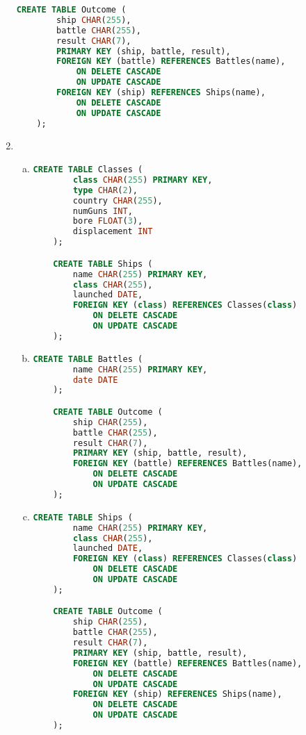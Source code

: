 \documentclass[12pt]{article}
\begin{document}
\begin{enumerate}[1.]
\begin{lstlisting}[language=SQL]
    CREATE TABLE Outcome (
        ship CHAR(255),
        battle CHAR(255),
        result CHAR(7),
        PRIMARY KEY (ship, battle, result),
        FOREIGN KEY (battle) REFERENCES Battles(name),
            ON DELETE CASCADE
            ON UPDATE CASCADE
        FOREIGN KEY (ship) REFERENCES Ships(name),
            ON DELETE CASCADE
            ON UPDATE CASCADE
    );

    \end{lstlisting}

    \item

    \begin{enumerate}[a)]
        \item

    \begin{lstlisting}[language=SQL]
    CREATE TABLE Classes (
        class CHAR(255) PRIMARY KEY,
        type CHAR(2),
        country CHAR(255),
        numGuns INT,
        bore FLOAT(3),
        displacement INT
    );

    CREATE TABLE Ships (
        name CHAR(255) PRIMARY KEY,
        class CHAR(255),
        launched DATE,
        FOREIGN KEY (class) REFERENCES Classes(class)
            ON DELETE CASCADE
            ON UPDATE CASCADE
    );
    \end{lstlisting}

        \item

    \begin{lstlisting}[language=SQL]
    CREATE TABLE Battles (
        name CHAR(255) PRIMARY KEY,
        date DATE
    );

    CREATE TABLE Outcome (
        ship CHAR(255),
        battle CHAR(255),
        result CHAR(7),
        PRIMARY KEY (ship, battle, result),
        FOREIGN KEY (battle) REFERENCES Battles(name),
            ON DELETE CASCADE
            ON UPDATE CASCADE
    );
    \end{lstlisting}

        \item

    \begin{lstlisting}[language=SQL]
    CREATE TABLE Ships (
        name CHAR(255) PRIMARY KEY,
        class CHAR(255),
        launched DATE,
        FOREIGN KEY (class) REFERENCES Classes(class)
            ON DELETE CASCADE
            ON UPDATE CASCADE
    );

    CREATE TABLE Outcome (
        ship CHAR(255),
        battle CHAR(255),
        result CHAR(7),
        PRIMARY KEY (ship, battle, result),
        FOREIGN KEY (battle) REFERENCES Battles(name),
            ON DELETE CASCADE
            ON UPDATE CASCADE
        FOREIGN KEY (ship) REFERENCES Ships(name),
            ON DELETE CASCADE
            ON UPDATE CASCADE
    );
    \end{lstlisting}


\end{enumerate}
\end{enumerate}
\end{document}

